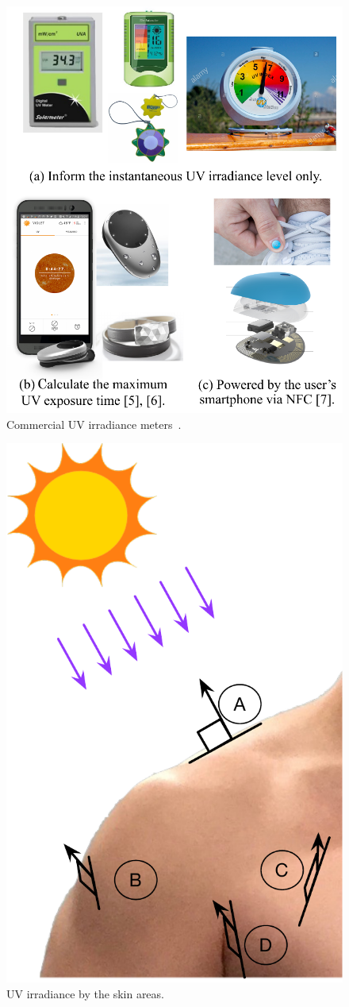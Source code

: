 \documentclass[journal]{IEEEtran}
\begin{document}
\begin{figure}
\centering
\includegraphics[width=0.8\hsize]{Figures/UVI_meter.pdf}
\caption{Commercial UV irradiance meters~\cite{Netatmo, Ultra, LOreal}.}
\label{fig:UVI_meters}
\end{figure}

\begin{figure}
\centering
\includegraphics[width=0.4\hsize]{Figures/UV_skin_areas.pdf}
\caption{UV irradiance by the skin areas.}
\label{fig:UV_exposure_skin}
\end{figure}
\end{document}
